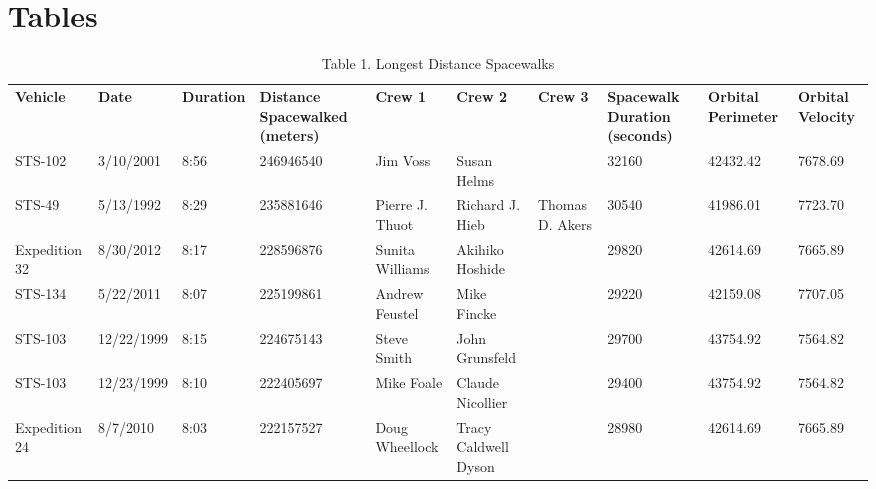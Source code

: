 \documentclass[sigconf]{acmart}
\begin{document}
\section{Tables}

\begin{table}[]
	\centering
	\caption{Table 1. Longest Distance Spacewalks}
	\label{mytable}
	\begin{tabular}{llllllllll}
		\textbf{Vehicle} & \textbf{Date} & \textbf{Duration} & \textbf{Distance Spacewalked (meters)} & \textbf{Crew 1}    & \textbf{Crew 2}      & \textbf{Crew 3} & \textbf{Spacewalk Duration (seconds)} & \textbf{Orbital Perimeter} & \textbf{Orbital Velocity} \\
		STS-102          & 3/10/2001     & 8:56              & 246946540                              & Jim Voss           & Susan Helms          &                 & 32160                                 & 42432.42                   & 7678.69                   \\
		STS-49           & 5/13/1992     & 8:29              & 235881646                              & Pierre J. Thuot    & Richard J. Hieb      & Thomas D. Akers & 30540                                 & 41986.01                   & 7723.70                   \\
		Expedition 32    & 8/30/2012     & 8:17              & 228596876                              & Sunita Williams    & Akihiko Hoshide      &                 & 29820                                 & 42614.69                   & 7665.89                   \\
		STS-134          & 5/22/2011     & 8:07              & 225199861                              & Andrew Feustel     & Mike Fincke          &                 & 29220                                 & 42159.08                   & 7707.05                   \\
		STS-103          & 12/22/1999    & 8:15              & 224675143                              & Steve Smith        & John Grunsfeld       &                 & 29700                                 & 43754.92                   & 7564.82                   \\
		STS-103          & 12/23/1999    & 8:10              & 222405697                              & Mike Foale         & Claude Nicollier     &                 & 29400                                 & 43754.92                   & 7564.82                   \\
		Expedition 24    & 8/7/2010      & 8:03              & 222157527                              & Doug Wheellock     & Tracy Caldwell Dyson &                 & 28980                                 & 42614.69                   & 7665.89                   \\

\end{tabular}
\end{table}
\end{document}
